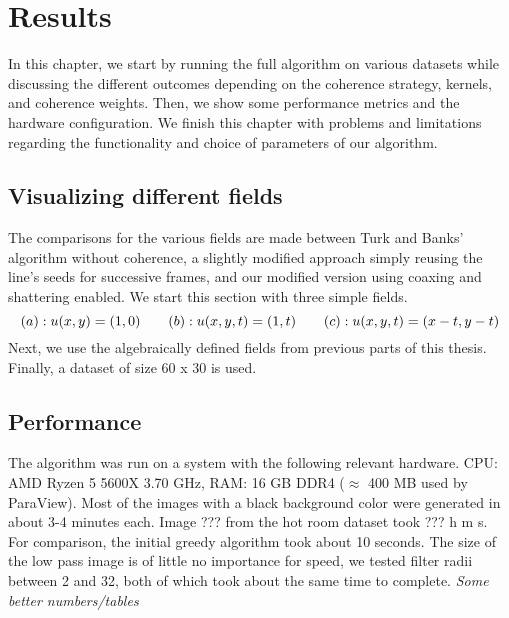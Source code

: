 
\chapter{Results}
\label{chap:Results}
In this chapter, we start by running the full algorithm on various datasets while
discussing the different outcomes depending on the coherence strategy, kernels, and coherence weights.
Then, we show some performance metrics and the hardware configuration.
We finish this chapter with problems and limitations regarding the functionality
and choice of parameters of our algorithm.

\section{Visualizing different fields}
The comparisons for the various fields are made between Turk and Banks' algorithm without coherence,
a slightly modified approach simply reusing the line's seeds for successive frames, and our modified version
using coaxing and shattering enabled.
We start this section with three simple fields.
\[(a): u(x,y) = (1,0) \hspace{7mm} (b): u(x,y,t)=(1,t) \hspace{7mm} (c): u(x,y,t)=(x-t, y-t)\]
Next, we use the algebraically defined fields from previous parts of this thesis.\\

\noindent Finally, a dataset of size 60 x 30 is used.

\section{Performance}
The algorithm was run on a system with the following relevant hardware.
CPU: AMD Ryzen 5 5600X 3.70 GHz, RAM: 16 GB DDR4 ($\approx$ 400 MB used by ParaView).
Most of the images with a black background color were generated in about 3-4 minutes each.
Image ??? from the hot room dataset took ??? h m s.
For comparison, the initial greedy algorithm took about 10 seconds.
The size of the low pass image is of little no importance for speed, we tested filter radii between 2 and 32,
both of which took about the same time to complete.
\textit{Some better numbers/tables}

